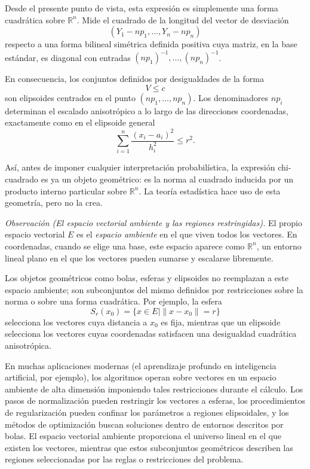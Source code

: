 \medskip

Desde el presente punto de vista, esta expresión es simplemente una forma
cuadrática sobre $\mathbb{R}^n$.
Mide el cuadrado de la longitud del vector de desviación
\[
(Y_1 - np_1,\dots,Y_n - np_n)
\]
respecto a una forma bilineal simétrica definida positiva cuya matriz, en la
base estándar, es diagonal con entradas
$(np_1)^{-1},\dots,(np_n)^{-1}$.

\medskip

En consecuencia, los conjuntos definidos por desigualdades de la forma
\[
V \le c
\]
son elipsoides centrados en el punto $(np_1,\dots,np_n)$.
Los denominadores $np_i$ determinan el escalado anisotrópico a lo largo de
las direcciones coordenadas, exactamente como en el elipsoide general
\[
\sum_{i=1}^n \frac{(x_i-a_i)^2}{h_i^2} \le r^2.
\]

\medskip

Así, antes de imponer cualquier interpretación probabilística, la expresión
chi-cuadrado es ya un objeto geométrico: es la norma al cuadrado inducida
por un producto interno particular sobre $\mathbb{R}^n$.
La teoría estadística hace uso de esta geometría, pero no la crea.

\medskip

\textit{Observación (El espacio vectorial ambiente y las regiones restringidas).}
El propio espacio vectorial $E$ es el \emph{espacio ambiente} en el que viven
todos los vectores.
En coordenadas, cuando se elige una base, este espacio aparece como
$\mathbb{R}^n$, un entorno lineal plano en el que los vectores pueden sumarse
y escalarse libremente.

\medskip

Los objetos geométricos como bolas, esferas y elipsoides no reemplazan a este
espacio ambiente; son subconjuntos del mismo definidos por restricciones sobre
la norma o sobre una forma cuadrática.
Por ejemplo, la esfera
\[
S_r(x_0)=\{x\in E \mid \|x-x_0\|=r\}
\]
selecciona los vectores cuya distancia a $x_0$ es fija, mientras que un
elipsoide selecciona los vectores cuyas coordenadas satisfacen una desigualdad
cuadrática anisotrópica.

\medskip

En muchas aplicaciones modernas (el aprendizaje profundo en inteligencia
artificial, por ejemplo), los algoritmos operan sobre vectores en un espacio
ambiente de alta dimensión imponiendo tales restricciones durante el cálculo.
Los pasos de normalización pueden restringir los vectores a esferas, los
procedimientos de regularización pueden confinar los parámetros a regiones
elipsoidales, y los métodos de optimización buscan soluciones dentro de
entornos descritos por bolas.
El espacio vectorial ambiente proporciona el universo lineal en el que existen
los vectores, mientras que estos subconjuntos geométricos describen las regiones
seleccionadas por las reglas o restricciones del problema.